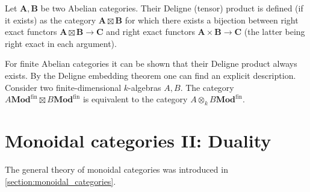     \begin{construct}
        Let $\mathbf{A},\mathbf{B}$ be two Abelian categories. Their Deligne (tensor) product is defined (if it exists) as the category $\mathbf{A}\boxtimes\mathbf{B}$ for which there exists a bijection between right exact functors $\mathbf{A}\boxtimes\mathbf{B}\rightarrow\mathbf{C}$ and right exact functors $\mathbf{A}\times\mathbf{B}\rightarrow\mathbf{C}$ (the latter being right exact in each argument).

        For finite Abelian categories it can be shown that their Deligne product always exists. By the Deligne embedding theorem one can find an explicit description. Consider two finite-dimensional $k$-algebras $A, B$. The category $A\mathbf{Mod}^{\mathrm{fin}}\boxtimes B\mathbf{Mod}^{\mathrm{fin}}$ is equivalent to the category $A\otimes_kB\mathbf{Mod}^{\mathrm{fin}}$.
    \end{construct}

\section{Monoidal categories II: Duality}\label{section:duality}

    The general theory of monoidal categories was introduced in \cref{section:monoidal_categories}.


